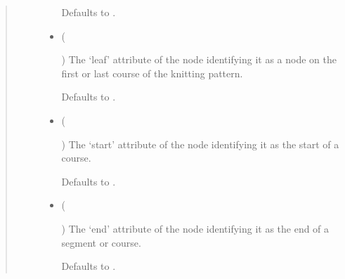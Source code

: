 \documentclass[letterpaper,10pt,english]{sphinxmanual}
\begin{document}
\begin{fulllineitems}
\begin{fulllineitems}
\begin{quote}
\begin{description}
\begin{itemize}
Defaults to .


\item {} 
 (%
\begin{footnote}[94]\sphinxAtStartFootnote
{}
%
\end{footnote}\sphinxstyleliteralemphasis{\sphinxupquote{, }}) \textendash{} 
The ‘leaf’ attribute of the node identifying it as a node on the
first or last course of the knitting pattern.

Defaults to .


\item {} 
 (%
\begin{footnote}[95]\sphinxAtStartFootnote
{}
%
\end{footnote}\sphinxstyleliteralemphasis{\sphinxupquote{, }}) \textendash{} 
The ‘start’ attribute of the node identifying it as the start of
a course.

Defaults to .


\item {} 
 (%
\begin{footnote}[96]\sphinxAtStartFootnote
{}
%
\end{footnote}\sphinxstyleliteralemphasis{\sphinxupquote{, }}) \textendash{} 
The ‘end’ attribute of the node identifying it as the end of a
segment or course.

Defaults to .



\end{itemize}
\end{description}
\end{quote}
\end{fulllineitems}
\end{fulllineitems}
\end{document}
